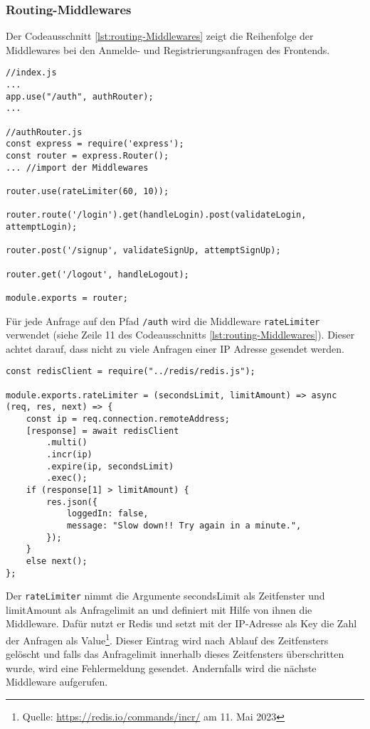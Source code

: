 \subsubsection{Routing-Middlewares}
Der Codeausschnitt \ref{lst:routing-Middlewares} zeigt die Reihenfolge der Middlewares bei den Anmelde- und Registrierungsanfragen des Frontends.
\begin{lstlisting}[style=codeStyle, caption={Ausschnitt aus index.js und die Datei authRouter.js}, label={lst:routing-Middlewares}]
//index.js
...
app.use("/auth", authRouter);
...

//authRouter.js
const express = require('express');
const router = express.Router();
... //import der Middlewares

router.use(rateLimiter(60, 10));

router.route('/login').get(handleLogin).post(validateLogin, attemptLogin);

router.post('/signup', validateSignUp, attemptSignUp);

router.get('/logout', handleLogout);

module.exports = router;
\end{lstlisting}

Für jede Anfrage auf den Pfad \verb|/auth| wird die Middleware \verb|rateLimiter| verwendet (siehe Zeile 11 des Codeausschnitts \ref{lst:routing-Middlewares}). Dieser achtet darauf, dass nicht zu viele Anfragen einer IP Adresse gesendet werden. 

\begin{lstlisting}[style=codeStyle, caption={Die rateLimiter Middleware}, label={lst:rateLimiter}]
const redisClient = require("../redis/redis.js");

module.exports.rateLimiter = (secondsLimit, limitAmount) => async (req, res, next) => {
    const ip = req.connection.remoteAddress;
    [response] = await redisClient
        .multi()
        .incr(ip)
        .expire(ip, secondsLimit)
        .exec();
    if (response[1] > limitAmount) {
        res.json({
            loggedIn: false,
            message: "Slow down!! Try again in a minute.",
        });
    }
    else next();
};
\end{lstlisting}

Der \verb|rateLimiter| nimmt die Argumente secondsLimit als Zeitfenster und limitAmount als Anfragelimit an und definiert mit Hilfe von ihnen die Middleware. Dafür nutzt er Redis und setzt mit der IP-Adresse als Key die Zahl der Anfragen als Value\footnote{Quelle: \url{https://redis.io/commands/incr/} am 11. Mai 2023}. Dieser Eintrag wird nach Ablauf des Zeitfensters gelöscht und falls das Anfragelimit innerhalb dieses Zeitfensters überschritten wurde, wird eine Fehlermeldung gesendet. Andernfalls wird die nächste Middleware aufgerufen.


